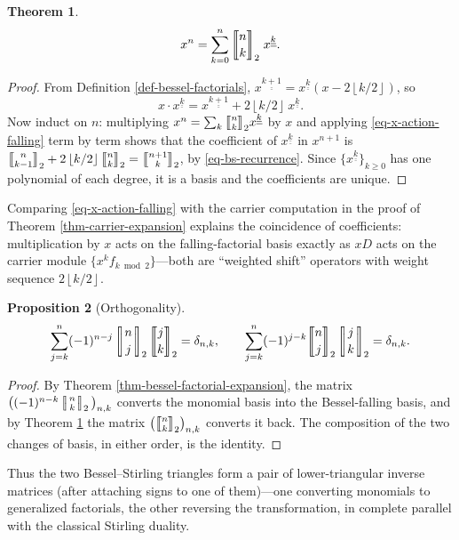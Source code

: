 \documentclass[a4paper]{amsart}
\numberwithin{equation}{section}
\newcommand{\mStirling}[0]{\genfrac{\llbracket}{\rrbracket}{0pt}{}}
\newcommand{\mStirlingone}[2]{\left[\mkern-3.8mu\middle|\genfrac{}{}{0pt}{}{#1}{#2}\middle|\mkern-3.8mu\right]}
\newcommand{\uuline}[1]{\underline{\underline{#1}}}
\newcommand{\floor}[1]{\left\lfloor #1 \right\rfloor}
\newtheorem{theorem}{Theorem}[section]
\newtheorem{proposition}[theorem]{Proposition}
\begin{document}
\begin{theorem}\label{thm-inverse-expansion}
\[
x^n =\sum_{k=0}^n \mStirling{n}{k}_2\; x^{\uuline{k}}.
\]
\end{theorem}
\begin{proof}
From Definition \ref{def-bessel-factorials}, $x^{\uuline{k+1}} = x^{\uuline{k}}(x - 2\floor{k/2})$, so
\begin{equation}\label{eq-x-action-falling}
x \cdot x^{\uuline{k}} = x^{\uuline{k+1}} + 2\floor{k/2}\, x^{\uuline{k}}.
\end{equation}
Now induct on $n$: multiplying $x^n = \sum_k \mStirling{n}{k}_2 x^{\uuline{k}}$ by $x$ and applying \eqref{eq-x-action-falling} term by term shows that the coefficient of $x^{\uuline{k}}$ in $x^{n+1}$ is $\mStirling{n}{k-1}_2 + 2\floor{k/2}\mStirling{n}{k}_2 = \mStirling{n+1}{k}_2$, by \eqref{eq-bs-recurrence}. Since $\{x^{\uuline{k}}\}_{k \ge 0}$ has one polynomial of each degree, it is a basis and the coefficients are unique.
\end{proof}

Comparing \eqref{eq-x-action-falling} with the carrier computation in the proof of Theorem \ref{thm-carrier-expansion} explains the coincidence of coefficients: multiplication by $x$ acts on the falling-factorial basis exactly as $xD$ acts on the carrier module $\{x^k f_{k \bmod 2}\}$---both are ``weighted shift'' operators with weight sequence $2\floor{k/2}$.

\begin{proposition}[Orthogonality]\label{prop-orthogonality}
    \[
        \sum_{j=k}^n (-1)^{n-j}\mStirlingone{n}{j}_2\mStirling{j}{k}_2=\delta_{n,k},
        \qquad
        \sum_{j=k}^n (-1)^{j-k}\mStirling{n}{j}_2\mStirlingone{j}{k}_2=\delta_{n,k}.
    \]
\end{proposition}
\begin{proof}
By Theorem \ref{thm-bessel-factorial-expansion}, the matrix $\big((-1)^{n-k}\mStirlingone{n}{k}_2\big)_{n,k}$ converts the monomial basis into the Bessel-falling basis, and by Theorem \ref{thm-inverse-expansion} the matrix $\big(\mStirling{n}{k}_2\big)_{n,k}$ converts it back. The composition of the two changes of basis, in either order, is the identity.
\end{proof}

Thus the two Bessel--Stirling triangles form a pair of lower-triangular inverse matrices (after attaching signs to one of them)---one converting monomials to generalized factorials, the other reversing the transformation, in complete parallel with the classical Stirling duality.
\end{document}
